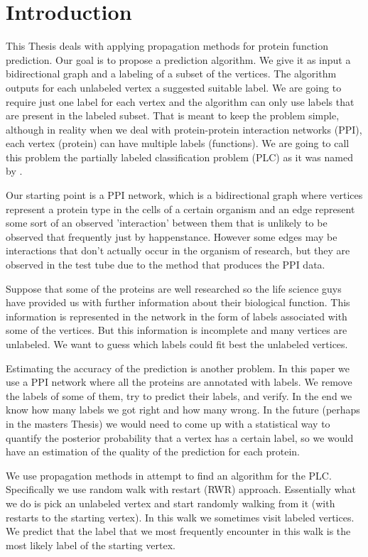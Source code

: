 \documentclass[a4paper,10pt]{article}
\theoremstyle{definition}
\theoremstyle{remark}
\theoremstyle{plain}
\begin{document}
\tableofcontents

\section{Introduction}

This Thesis deals with applying propagation methods for
protein function prediction. Our goal is to propose a prediction
algorithm.  We give it as input a
bidirectional graph and a labeling of a subset of the
vertices. The algorithm outputs for each unlabeled vertex  a
suggested suitable label.
We are going to require just one label for each vertex
and the algorithm can only use labels that are present in the
labeled subset. That is meant to keep the problem simple, although
in reality when we deal with protein-protein interaction networks
(PPI), each vertex (protein) can have multiple labels (functions).
We are going to call this problem the partially labeled
classification problem (PLC) as it was named by
\cite{szummer2002partially}.

Our starting point is a PPI network, which is a bidirectional graph
where vertices represent a protein type in the cells of a certain
organism and an edge represent some sort of an observed
'interaction' between them that is unlikely to be observed that
frequently just by happenstance. However some edges may be
interactions that don't actually occur in the organism of research,
but they are observed in the test tube due to the method that
produces the PPI data.

Suppose that some of the proteins are well researched so the life science guys
have provided us with further information about their biological function. This
information is represented in the network in the form of labels associated with
some of the vertices. But this information is incomplete and many vertices are
unlabeled. We want to guess which labels could fit best the
unlabeled vertices.

Estimating the accuracy of the prediction is another problem. In
this paper we use a PPI network where all the proteins are annotated
with labels. We remove the labels of some of them, try to predict
their labels, and verify. In the end we know how many labels we got
right and how many wrong. In the future (perhaps in the masters
Thesis) we would need to come up with a statistical way to quantify
the posterior probability that a vertex has a certain label, so we
would have an estimation of the quality of the prediction for each
protein.

We use propagation methods in attempt to find an algorithm for the
PLC. Specifically we use random walk with restart (RWR) approach.
Essentially what we do is pick an unlabeled vertex and start
randomly walking from it (with restarts to the starting vertex). In
this walk we sometimes visit labeled vertices. We predict that the
label that we most frequently encounter in this walk is the most
likely label of the starting vertex.
\end{document}
